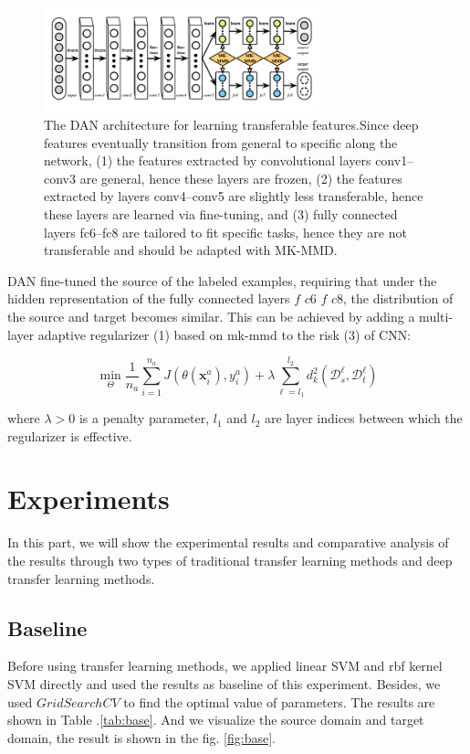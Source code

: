 \documentclass[conference]{IEEEtran}
\begin{document}
\begin{center}
	\begin{figure}[htbp]
		\centering
		\label{kFig2}
		\includegraphics[width=8cm]{image/DAN.png}
		\caption{The DAN architecture for learning transferable features.Since deep features eventually transition from general to specific along the network, (1) the features extracted by convolutional layers conv1–conv3 are general, hence these layers are frozen, (2) the features extracted by layers conv4–conv5 are slightly less transferable, hence these layers are learned via fine-tuning, and (3) fully connected layers fc6–fc8 are tailored to fit specific tasks, hence they are not transferable and should be adapted with MK-MMD.\cite{Long2015Learning}}
	\end{figure}
\end{center}

DAN fine-tuned the source of the labeled examples, requiring that under the hidden representation of the fully connected layers $f$ $c6$ $f$ $c8$, the distribution of the source and target becomes similar. This can be achieved by adding a multi-layer adaptive regularizer (1) based on mk-mmd to the risk (3) of CNN:

$$
\min _{\Theta} \frac{1}{n_{a}} \sum_{i=1}^{n_{a}} J\left(\theta\left(\mathbf{x}_{i}^{a}\right), y_{i}^{a}\right)+\lambda \sum_{\ell=l_{1}}^{l_{2}} d_{k}^{2}\left(\mathcal{D}_{s}^{\ell}, \mathcal{D}_{t}^{\ell}\right)
$$


where $\lambda > 0$ is a penalty parameter, $l_1$ and $l_2$ are layer indices between which the regularizer is effective.

\section{Experiments}

In this part, we will show the experimental results and comparative analysis of the results through two types of traditional transfer learning methods and deep transfer learning methods.


\subsection{Baseline}
Before using transfer learning methods, we applied linear SVM and rbf kernel SVM directly and used the results as baseline of this experiment. Besides, we used $GridSearchCV$ to find the optimal value of parameters. The results are shown in Table .\ref{tab:base}. And we visualize the source domain and target domain, the result is shown in the fig. \ref{fig:base}.
\end{document}
